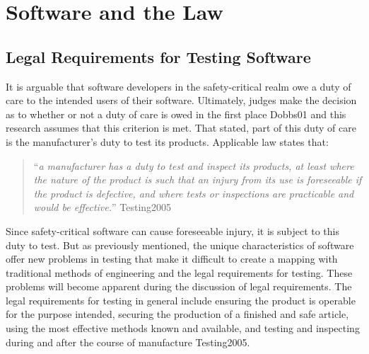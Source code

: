 \chapter{Software and the Law}\label{C:Software}

\section{Legal Requirements for Testing Software}

It is arguable that software developers in the safety-critical realm owe a duty
of care to the intended users of their software. Ultimately, judges make the
decision as to whether or not a duty of care is owed in the first place
\cite{refs}{Dobbs01} and this research assumes that this criterion is met. That
stated, part of this duty of care is the manufacturer's duty to test its
products. Applicable law states that:

\begin{quote}
``\textit{a manufacturer has a duty to test and inspect its products, at least
where the nature of the product is such that an injury from its use is 
foreseeable if the product is defective, and where tests or inspections are 
practicable and would be effective.}'' \cite{refs}{Testing2005}
\end{quote}

Since safety-critical software can cause foreseeable injury, it is subject to
this duty to test. But as previously mentioned, the unique characteristics of
software offer new problems in testing that make it difficult to create a
mapping with traditional methods of engineering and the legal requirements for
testing. These problems will become apparent during the discussion of legal
requirements. The legal requirements for testing in general include ensuring the
product is operable for the purpose intended, securing the production of a
finished and safe article, using the most effective methods known and available,
and testing and inspecting during and after the course of manufacture
\cite{refs}{Testing2005}.

